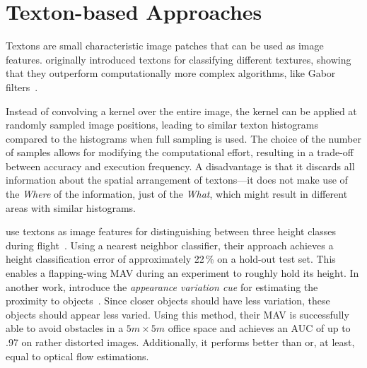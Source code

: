 \section{Texton-based Approaches}
\label{sec:textonbasedapproaches}

Textons are small characteristic image patches that can be used as image features.
\citeauthor{varma2005statistical} originally introduced textons for
classifying different textures, showing that they outperform
computationally more complex algorithms, like Gabor
filters~\cite{varma2005statistical}.

Instead of convolving a kernel over the entire image, the kernel can be applied at randomly sampled image positions, leading to similar texton histograms compared to the histograms when full sampling is used. The choice of the number of samples allows for modifying the computational effort, resulting in a
trade-off between accuracy and execution frequency. A disadvantage is
that it discards all information about the spatial arrangement of
textons---it does not make use of the \emph{Where} of the information,
just of the \emph{What}, which might result in different areas with
similar histograms.

\citeauthor{de2009design} use textons as image features for distinguishing
between three height classes during flight~\cite{de2009design}. Using
a nearest neighbor classifier, their approach achieves a height
classification error of approximately 22\,\% on a hold-out test set.
This enables a flapping-wing MAV during an experiment to roughly hold
its height. In another work, \citeauthor{de2012appearance} introduce
the \emph{appearance variation cue} for estimating the proximity to
objects~\cite{de2012appearance}. Since closer objects should have less
variation, these objects should appear less varied. Using this method,
their MAV is successfully able to avoid obstacles in a $5m \times 5m$
office space and achieves an AUC of up to .97 on rather distorted
images. Additionally, it performs better than or, at least, equal to
optical flow estimations.
